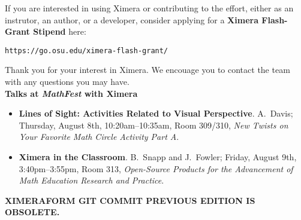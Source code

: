 \documentclass{article}
\begin{document}
\begin{multicols}{2}
    If you are interested in using Ximera or contributing to the effort, either
    as an instrutor, an author, or a developer, consider
    applying for a \textbf{Ximera Flash-Grant Stipend} here:
    \begin{center}
        \tt  https://go.osu.edu/ximera-flash-grant/
    \end{center}
    Thank you for your interest in Ximera. We encouage you
    to contact the team with  any questions you may have.
    \\[.5cm]
    {\sffamily\bfseries Talks at \textsl{MathFest} with Ximera}\\
    \begin{itemize}
        \item[{[1]}] \textbf{Lines of Sight: Activities Related to Visual
            Perspective}. A.\ Davis; Thursday, August 8th, 10:20am--10:35am,
        Room 309/310,
        \textit{New Twists on Your Favorite Math Circle Activity Part A}.
        \item[{[2]}] \textbf{Ximera in the Classroom}. B.\ Snapp and J.\
        Fowler;
        Friday, August 9th, 3:40pm--3:55pm, Room 313, \textit{Open-Source
            Products for
            the Advancement of Math Education Research and Practice}.
    \end{itemize}
\end{multicols}
\vfill
\sffamily\tiny\textbf{XIMERA\quad FORM  \quad GIT \quad COMMIT \quad
     \quad PREVIOUS \quad EDITION \quad IS
    \quad
    OBSOLETE.}
\end{document}
